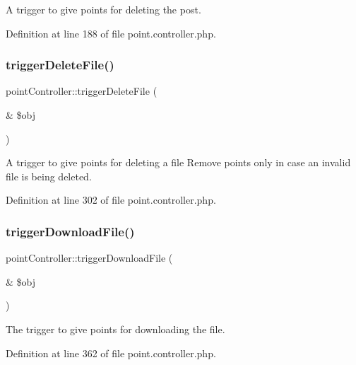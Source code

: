 A trigger to give points for deleting the post. 



Definition at line 188 of file point.\+controller.\+php.

\hypertarget{classpointController_a1d303c7b8ada6f84e53b5d32336bc313}{}\label{classpointController_a1d303c7b8ada6f84e53b5d32336bc313} 
\subsubsection{\texorpdfstring{trigger\+Delete\+File()}{triggerDeleteFile()}}
{\footnotesize\ttfamily point\+Controller\+::trigger\+Delete\+File (\begin{DoxyParamCaption}\item[{\&}]{\$obj }\end{DoxyParamCaption})}



A trigger to give points for deleting a file Remove points only in case an invalid file is being deleted. 



Definition at line 302 of file point.\+controller.\+php.

\hypertarget{classpointController_ab6a0e04cef3ea03a427a505ed829c027}{}\label{classpointController_ab6a0e04cef3ea03a427a505ed829c027} 
\subsubsection{\texorpdfstring{trigger\+Download\+File()}{triggerDownloadFile()}}
{\footnotesize\ttfamily point\+Controller\+::trigger\+Download\+File (\begin{DoxyParamCaption}\item[{\&}]{\$obj }\end{DoxyParamCaption})}



The trigger to give points for downloading the file. 



Definition at line 362 of file point.\+controller.\+php.

\hypertarget{classpointController_adfd5758c92bb06d2b77ccc3ac432f0c1}{}\label{classpointController_adfd5758c92bb06d2b77ccc3ac432f0c1} 

